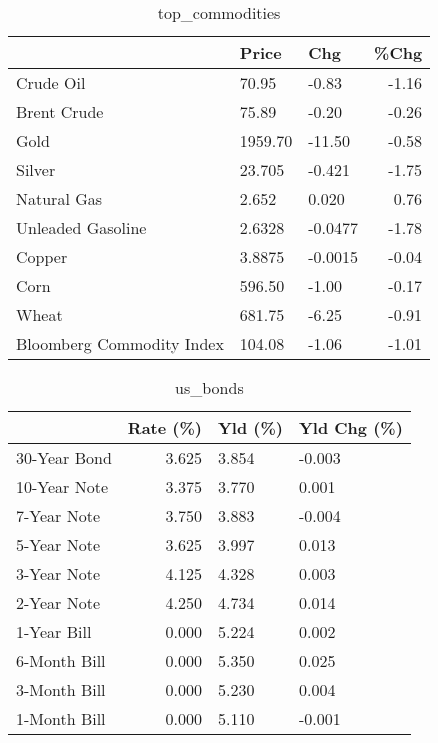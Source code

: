 \documentclass{article}%
\begin{document}
\begin{table}[htbp]%
\caption{top\_commodities}%
\centering%
\begin{adjustbox}{width=1\textwidth}%
\begin{tabular}{lllr}
\toprule
                          &   Price &     Chg &  \%Chg \\
\midrule
               Crude Oil  &   70.95 &   -0.83 & -1.16 \\
             Brent Crude  &   75.89 &   -0.20 & -0.26 \\
                    Gold  & 1959.70 &  -11.50 & -0.58 \\
                  Silver  &  23.705 &  -0.421 & -1.75 \\
             Natural Gas  &   2.652 &   0.020 &  0.76 \\
       Unleaded Gasoline  &  2.6328 & -0.0477 & -1.78 \\
                  Copper  &  3.8875 & -0.0015 & -0.04 \\
                    Corn  &  596.50 &   -1.00 & -0.17 \\
                   Wheat  &  681.75 &   -6.25 & -0.91 \\
Bloomberg Commodity Index &  104.08 &   -1.06 & -1.01 \\
\bottomrule
\end{tabular}
%
\end{adjustbox}%
\end{table}

%


\begin{table}[htbp]%
\caption{us\_bonds}%
\centering%
\begin{adjustbox}{width=1\textwidth}%
\begin{tabular}{lrll}
\toprule
             &  Rate (\%) & Yld (\%) & Yld Chg (\%) \\
\midrule
30-Year Bond &     3.625 &   3.854 &      -0.003 \\
10-Year Note &     3.375 &   3.770 &       0.001 \\
 7-Year Note &     3.750 &   3.883 &      -0.004 \\
 5-Year Note &     3.625 &   3.997 &       0.013 \\
 3-Year Note &     4.125 &   4.328 &       0.003 \\
 2-Year Note &     4.250 &   4.734 &       0.014 \\
 1-Year Bill &     0.000 &   5.224 &       0.002 \\
6-Month Bill &     0.000 &   5.350 &       0.025 \\
3-Month Bill &     0.000 &   5.230 &       0.004 \\
1-Month Bill &     0.000 &   5.110 &      -0.001 \\
\bottomrule
\end{tabular}
%
\end{adjustbox}%
\end{table}
\end{document}
